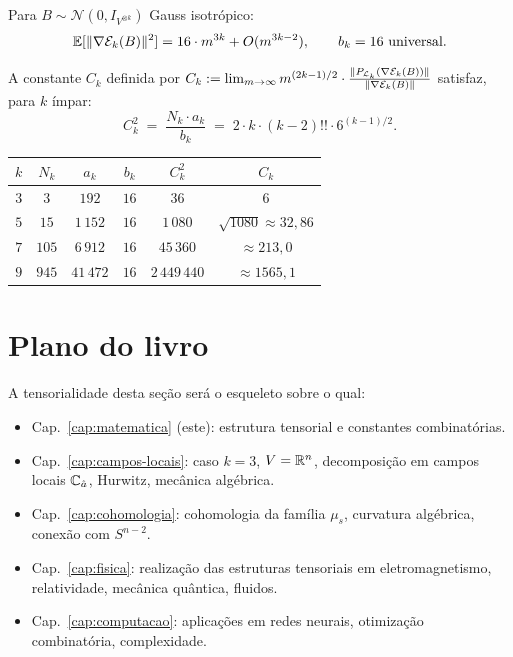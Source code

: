 \documentclass[tensorial.tex]{subfiles}
\providecommand{\sL}{\mathcal{L}}
\begin{document}
\begin{teorema}[Constante $b_k$]\label{thm:b-k-cap1}
Para $B \sim \mathcal{N}(0, I_{V^{\otimes k}})$ Gauss isotrópico:
\begin{equation}
  \mathbb{E}[\| \nabla \mathcal{E}_k(B) \|^2] = 16 \cdot m^{3k} + O(m^{3k-2}),
  \qquad b_k = 16 \text{ universal}.
\end{equation}
\end{teorema}

\begin{teorema}\label{thm:Ck-cap1}
A constante $C_k$ definida por
$C_k := \lim_{m \to \infty} m^{(2k-1)/2} \cdot \frac{\norm{P_{\sL_k}(\nabla \mathcal{E}_k(B))}}{\norm{\nabla \mathcal{E}_k(B)}}$
satisfaz, para $k$ ímpar:
\begin{equation}
  \boxed{C_k^2 \;=\; \frac{N_k \cdot a_k}{b_k} \;=\; 2 \cdot k \cdot (k-2)!! \cdot 6^{(k-1)/2}.}
\end{equation}
\end{teorema}

\begin{center}
\begin{tabular}{cccccc}
\toprule
$k$ & $N_k$ & $a_k$ & $b_k$ & $C_k^2$ & $C_k$ \\
\midrule
$3$ & $3$ & $192$ & $16$ & $36$ & $6$ \\
$5$ & $15$ & $1\,152$ & $16$ & $1\,080$ & $\sqrt{1080} \approx 32{,}86$ \\
$7$ & $105$ & $6\,912$ & $16$ & $45\,360$ & $\approx 213{,}0$ \\
$9$ & $945$ & $41\,472$ & $16$ & $2\,449\,440$ & $\approx 1565{,}1$ \\
\bottomrule
\end{tabular}
\end{center}

\section{Plano do livro}

A tensorialidade desta seção será o esqueleto sobre o qual:
\begin{itemize}[leftmargin=2em,nosep]
  \item Cap.~\ref{cap:matematica} (este): estrutura tensorial e constantes
        combinatórias.
  \item Cap.~\ref{cap:campos-locais}: caso $k = 3$, $V = \mathbb{R}^n$, decomposição
        em campos locais $\mathbb{C}_{\hat a}$, Hurwitz, mecânica algébrica.
  \item Cap.~\ref{cap:cohomologia}: cohomologia da família $\mu_s$,
        curvatura algébrica, conexão com $S^{n-2}$.
  \item Cap.~\ref{cap:fisica}: realização das estruturas tensoriais em
        eletromagnetismo, relatividade, mecânica quântica, fluidos.
  \item Cap.~\ref{cap:computacao}: aplicações em redes neurais, otimização
        combinatória, complexidade.
\end{itemize}
\end{document}
